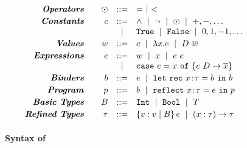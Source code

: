 
\begin{figure}[t!]
\centering
$$
\begin{array}{rrcl}
\emphbf{Operators} \quad
  & \odot
  & ::= & = \spmid  <
\\[0.03in]

\emphbf{Constants} \quad
  & c
  & ::=
  & \land \spmid \lnot \spmid \odot \spmid +,-,\dots  \\
  && \spmid & \etrue\spmid \efalse \spmid 0, 1,-1, \dots
\\[0.03in]

\emphbf{Values} \quad
  & w & ::=&  c
             \spmid \efun{x}{\typ}{e} \spmid D\ \overline{w}
\\[0.03in]

\emphbf{Expressions} \quad
  & e & ::=    & w \spmid x \spmid \eapp{e}{e}      \\
  &   & \spmid & \ecase{x}{e}{\dc}{\overline{x}}{e}
\\[0.03in]

\emphbf{Binders} \quad
  & \bd & ::= & e \spmid \eletb{x}{\gtyp}{\bd}{\bd}
\\[0.03in]

\emphbf{Program} \quad
  & \prog & ::= & \bd \spmid \erefb{x}{\gtyp}{e}{\prog}
\\[0.03in]


\emphbf{Basic Types} \quad
  & \btyp
  & ::=
  & \tint \spmid \tbool \spmid T
\\[0.03in]

\emphbf{Refined Types} \quad
  & \typ
  & ::=      & \tref{v}{\btyp}{\reft} \spmid \tfun{x}{\typ}{\typ}
\\[0.05in]
\end{array}
$$
\caption{\textbf{Syntax of \corelan}}
\label{fig:syntax}
\end{figure}

